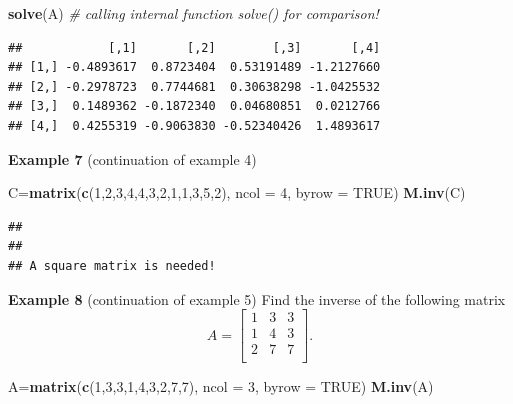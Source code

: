 \documentclass[
]{book}
\newenvironment{Shaded}{\begin{snugshade}}{\end{snugshade}}
\newcommand{\AttributeTok}[1]{\textcolor[rgb]{0.13,0.29,0.53}{#1}}
\newcommand{\CommentTok}[1]{\textcolor[rgb]{0.56,0.35,0.01}{\textit{#1}}}
\newcommand{\ConstantTok}[1]{\textcolor[rgb]{0.56,0.35,0.01}{#1}}
\newcommand{\DecValTok}[1]{\textcolor[rgb]{0.00,0.00,0.81}{#1}}
\newcommand{\FunctionTok}[1]{\textcolor[rgb]{0.13,0.29,0.53}{\textbf{#1}}}
\newcommand{\NormalTok}[1]{#1}
\newcommand{\OtherTok}[1]{\textcolor[rgb]{0.56,0.35,0.01}{#1}}
\begin{document}
\begin{Shaded}
\begin{Highlighting}[]
\FunctionTok{solve}\NormalTok{(A)   }\CommentTok{\# calling internal function solve() for comparison!}
\end{Highlighting}
\end{Shaded}

\begin{verbatim}
##            [,1]       [,2]        [,3]       [,4]
## [1,] -0.4893617  0.8723404  0.53191489 -1.2127660
## [2,] -0.2978723  0.7744681  0.30638298 -1.0425532
## [3,]  0.1489362 -0.1872340  0.04680851  0.0212766
## [4,]  0.4255319 -0.9063830 -0.52340426  1.4893617
\end{verbatim}

\textbf{Example 7} (continuation of example 4)

\begin{Shaded}
\begin{Highlighting}[]
\NormalTok{C}\OtherTok{=}\FunctionTok{matrix}\NormalTok{(}\FunctionTok{c}\NormalTok{(}\DecValTok{1}\NormalTok{,}\DecValTok{2}\NormalTok{,}\DecValTok{3}\NormalTok{,}\DecValTok{4}\NormalTok{,}\DecValTok{4}\NormalTok{,}\DecValTok{3}\NormalTok{,}\DecValTok{2}\NormalTok{,}\DecValTok{1}\NormalTok{,}\DecValTok{1}\NormalTok{,}\DecValTok{3}\NormalTok{,}\DecValTok{5}\NormalTok{,}\DecValTok{2}\NormalTok{), }\AttributeTok{ncol =} \DecValTok{4}\NormalTok{, }\AttributeTok{byrow =} \ConstantTok{TRUE}\NormalTok{)}
\FunctionTok{M.inv}\NormalTok{(C)}
\end{Highlighting}
\end{Shaded}

\begin{verbatim}
## 
## 
## A square matrix is needed!
\end{verbatim}

\textbf{Example 8} (continuation of example 5) Find the inverse of the following matrix
\[
A = \left[\begin{array}{cccc} 
1 & 3 & 3    \\ 
1 & 4 & 3  \\ 
2 & 7 & 7  \\
\end{array}
\right].
\]

\begin{Shaded}
\begin{Highlighting}[]
\NormalTok{A}\OtherTok{=}\FunctionTok{matrix}\NormalTok{(}\FunctionTok{c}\NormalTok{(}\DecValTok{1}\NormalTok{,}\DecValTok{3}\NormalTok{,}\DecValTok{3}\NormalTok{,}\DecValTok{1}\NormalTok{,}\DecValTok{4}\NormalTok{,}\DecValTok{3}\NormalTok{,}\DecValTok{2}\NormalTok{,}\DecValTok{7}\NormalTok{,}\DecValTok{7}\NormalTok{), }\AttributeTok{ncol =} \DecValTok{3}\NormalTok{, }\AttributeTok{byrow =} \ConstantTok{TRUE}\NormalTok{)}
\FunctionTok{M.inv}\NormalTok{(A)}
\end{Highlighting}
\end{Shaded}
\end{document}
